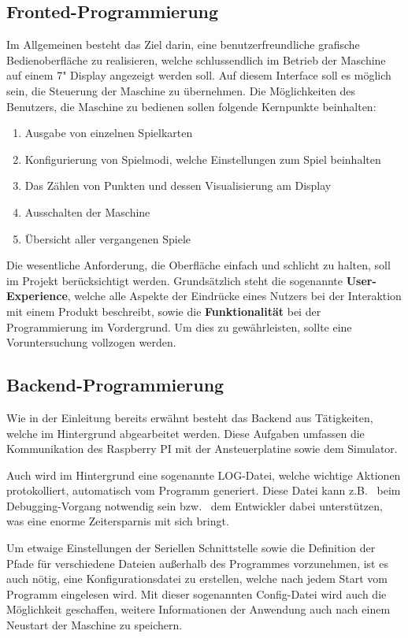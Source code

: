 \subsection{Fronted-Programmierung}\label{subsec:fronted-programmierung}
Im Allgemeinen besteht das Ziel darin, eine benutzerfreundliche grafische Bedienoberfläche zu realisieren, welche schlussendlich im Betrieb der Maschine auf einem 7" Display angezeigt werden soll.
Auf diesem Interface soll es möglich sein, die Steuerung der Maschine zu übernehmen.
Die Möglichkeiten des Benutzers, die Maschine zu bedienen sollen folgende Kernpunkte beinhalten:
\begin{enumerate}
    \item Ausgabe von einzelnen Spielkarten
    \item Konfigurierung von Spielmodi, welche Einstellungen zum Spiel beinhalten
    \item Das Zählen von Punkten und dessen Visualisierung am Display
    \item Ausschalten der Maschine
    \item Übersicht aller vergangenen Spiele
\end{enumerate}
Die wesentliche Anforderung, die Oberfläche einfach und schlicht zu halten, soll im Projekt berücksichtigt werden.
Grundsätzlich steht die sogenannte \textbf{User-Experience}, welche alle Aspekte der Eindrücke eines Nutzers bei der Interaktion mit einem Produkt beschreibt, sowie die \textbf{Funktionalität} bei der Programmierung im Vordergrund.
Um dies zu gewährleisten, sollte eine Voruntersuchung vollzogen werden.

\subsection{Backend-Programmierung}\label{subsec:backend-programmierung}
Wie in der Einleitung bereits erwähnt besteht das Backend aus Tätigkeiten, welche im Hintergrund abgearbeitet werden.
Diese Aufgaben umfassen die Kommunikation des Raspberry PI mit der Ansteuerplatine sowie dem Simulator.

Auch wird im Hintergrund eine sogenannte LOG-Datei, welche wichtige Aktionen protokolliert, automatisch vom Programm generiert.
Diese Datei kann z.B. \ beim Debugging-Vorgang notwendig sein bzw. \ dem Entwickler dabei unterstützen, was eine enorme Zeitersparnis mit sich bringt.

Um etwaige Einstellungen der Seriellen Schnittstelle sowie die Definition der Pfade für verschiedene Dateien außerhalb des Programmes vorzunehmen, ist es auch nötig, eine Konfigurationsdatei zu erstellen, welche nach jedem Start vom Programm eingelesen wird.
Mit dieser sogenannten Config-Datei wird auch die Möglichkeit geschaffen, weitere Informationen der Anwendung auch nach einem Neustart der Maschine zu speichern.

